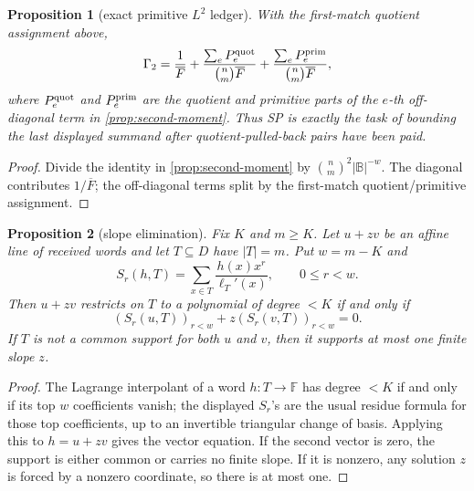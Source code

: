 \documentclass[a4paper,11pt]{amsart}
\newtheorem{proposition}[proposition]{Proposition}
\theoremstyle{remark}
\newcommand{\F}{\mathbb F}
\newcommand{\B}{\mathbb B}
\begin{document}
\begin{proposition}[exact primitive \(L^2\) ledger]\label{prop:gamma2-ledger}
With the first-match quotient assignment above,
\[
        \Gamma_2
        =
        \frac{1}{\overline F}
        +\frac{\sum_e P_e^{\rm quot}}{\binom{n}{m}\overline F}
        +\frac{\sum_e P_e^{\rm prim}}{\binom{n}{m}\overline F},
\]
where \(P_e^{\rm quot}\) and \(P_e^{\rm prim}\) are the quotient and primitive parts of the \(e\)-th off-diagonal term in \cref{prop:second-moment}.  Thus SP is exactly the task of bounding the last displayed summand after quotient-pulled-back pairs have been paid.
\end{proposition}

\begin{proof}
Divide the identity in \cref{prop:second-moment} by \(\binom{n}{m}^2|\B|^{-w}\).  The diagonal contributes \(1/\overline F\); the off-diagonal terms split by the first-match quotient/primitive assignment.
\end{proof}

\begin{proposition}[slope elimination]\label{prop:slope-elimination}
Fix \(K\) and \(m\ge K\).  Let \(u+zv\) be an affine line of received words and let \(T\subseteq D\) have \(|T|=m\).  Put \(w=m-K\) and
\[
        S_r(h,T)=\sum_{x\in T}\frac{h(x)x^r}{\ell_T'(x)},\qquad 0\le r<w.
\]
Then \(u+zv\) restricts on \(T\) to a polynomial of degree \(<K\) if and only if
\[
        (S_r(u,T))_{r<w}+z(S_r(v,T))_{r<w}=0.
\]
If \(T\) is not a common support for both \(u\) and \(v\), then it supports at most one finite slope \(z\).
\end{proposition}

\begin{proof}
The Lagrange interpolant of a word \(h:T\to\F\) has degree \(<K\) if and only if its top \(w\) coefficients vanish; the displayed \(S_r\)'s are the usual residue formula for those top coefficients, up to an invertible triangular change of basis.  Applying this to \(h=u+zv\) gives the vector equation.  If the second vector is zero, the support is either common or carries no finite slope.  If it is nonzero, any solution \(z\) is forced by a nonzero coordinate, so there is at most one.
\end{proof}
\end{document}

